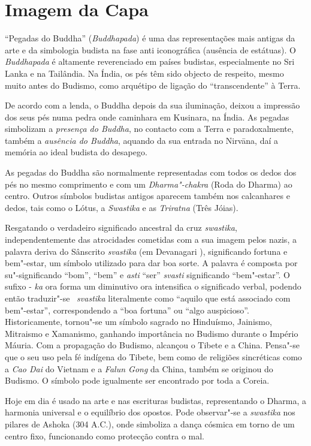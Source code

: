 \chapter{Imagem da Capa}

“Pegadas do Buddha” (\emph{Buddhapada}) é uma das representações mais antigas
da arte e da simbologia budista na fase anti iconográfica (ausência de
estátuas). O \emph{Buddhapada} é altamente reverenciado em países budistas,
especialmente no Sri Lanka e na Tailândia. Na Índia, os pés têm sido objecto de
respeito, mesmo muito antes do Budismo, como arquétipo de ligação do “transcendente”
à Terra.

De acordo com a lenda, o Buddha depois da sua iluminação, deixou a impressão dos
seus pés numa pedra onde caminhara em Kusinara, na Índia. As pegadas simbolizam
a \emph{presença do Buddha}, no contacto com a Terra e paradoxalmente, também a
\emph{ausência do Buddha}, aquando da sua entrada no Nirvāna, daí a memória ao
ideal budista do desapego.

As pegadas do Buddha são normalmente representadas com todos os dedos dos pés no
mesmo comprimento e com um \emph{Dharma"-chakra} (Roda do Dharma) ao
centro. Outros símbolos budistas antigos aparecem também nos calcanhares e
dedos, tais como o Lótus, a \emph{Swastika} e as \emph{Triratna} (Três Jóias).

Resgatando o verdadeiro significado ancestral da cruz \emph{swastika},
independentemente das atrocidades cometidas com a sua imagem pelos nazis, a
palavra deriva do Sânscrito \emph{svastika} (em Devanagari ),
significando fortuna e bem"-estar, um símbolo utilizado para dar boa sorte. A
palavra é composta por su"-significando “bom”, “bem” e \emph{asti} “ser”
\emph{svasti} significando “bem"-estar”. O sufixo - \emph{ka} ora forma um
diminutivo ora intensifica o significado verbal, podendo então
traduzir"-se ~\emph{svastika} literalmente como “aquilo que está associado com bem"-estar”,
correspondendo a “boa fortuna” ou “algo auspicioso”. Historicamente,
tornou"-se um símbolo sagrado no Hinduísmo, Jainismo, Mitraismo e Xamanismo,
ganhando importância no Budismo durante o Império Máuria. Com a propagação do
Budismo, alcançou o Tibete e a China. Pensa"-se que o seu uso pela fé indígena do
Tibete, bem como de religiões sincréticas como a \emph{Cao Dai} do Vietnam e a
\emph{Falun Gong} da China, também se originou do Budismo. O símbolo pode igualmente
ser encontrado por toda a Coreia.

Hoje em dia é usado na arte e nas escrituras budistas, representando o Dharma,
a harmonia universal e o equilíbrio dos opostos. Pode observar"-se
a \emph{swastika} nos pilares de Ashoka (304 A.C.), onde simboliza a dança
cósmica em torno de um centro fixo, funcionando como protecção contra o mal.
